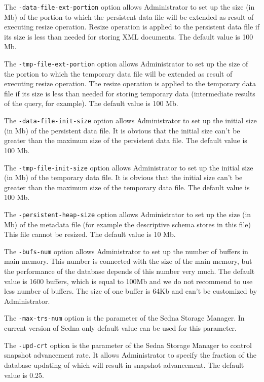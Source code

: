 \documentclass[a4paper,12pt]{article}
\begin{document}
The \verb!-data-file-ext-portion! option allows Administrator to set up the size (in Mb) of the portion to which the persistent data file will be extended as result of executing resize operation. Resize operation is applied to the persistent data file if its size is less than needed for storing XML documents. The default value is 100 Mb.

The \verb!-tmp-file-ext-portion! option allows Administrator to set up the size of the portion to which the temporary data file will be extended as result of executing resize operation. The resize operation is applied to the temporary data file if its size is less than needed for storing temporary data (intermediate results of the query, for example). The default value is 100 Mb.

The \verb!-data-file-init-size! option allows Administrator to set up the initial size (in Mb) of the persistent data file. It is obvious that the initial size can't be greater than the maximum size of the persistent data file. The default value is 100 Mb.

The \verb!-tmp-file-init-size! option allows Administrator to set up the initial size (in Mb) of the temporary data file. It is obvious that the initial size can't be greater than the maximum size of the temporary data file. The default value is 100 Mb.

The \verb!-persistent-heap-size! option allows Administrator to set up the size (in Mb) of the metadata file (for example the descriptive schema stores in this file) This file cannot be resized. The default value is 10 Mb.

The \verb!-bufs-num! option allows Administrator to set up the number of buffers in main memory. This number is connected with the size of the main memory, but the performance of the database depends of this number very much. The default value is 1600 buffers, which is equal to 100Mb and we do not recommend to use less number of buffers. The size of one buffer is 64Kb and can't be customized by Administrator.

The \verb!-max-trs-num! option is the parameter of the Sedna Storage Manager. In current version of Sedna only default value can be used for this parameter.

The \verb!-upd-crt! option is the parameter of the Sedna Storage Manager to control snapshot advancement rate. It allows Administrator to specify the fraction of the database updating of which will result in snapshot advancement. The default value is 0.25.
\end{document}
